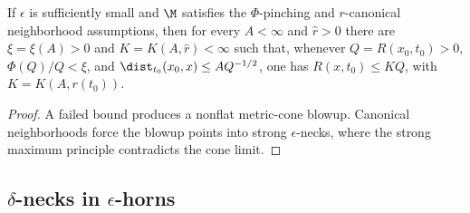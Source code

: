 \begin{lemma}
  \label{lem:kl-curvature-bounds-from-priori-assumptions-canonical-neighborhoods-lemma}
\label{claim2II.4.2}
If $\epsilon$ is sufficiently small and $\M$ satisfies the $\Phi$-pinching
and $r$-canonical neighborhood assumptions, then for every $A<\infty$ and
$\widehat r>0$ there are $\xi=\xi(A)>0$ and $K=K(A,\widehat r)<\infty$ such
that, whenever $Q=R(x_0,t_0)>0$, $\Phi(Q)/Q<\xi$, and
$\dist_{t_0}(x_0,x)\leq A Q^{-1/2}$, one has
$R(x,t_0)\leq KQ$, with $K=K(A,r(t_0))$.
\end{lemma}
\begin{proof}
\sketch A failed bound produces a nonflat metric-cone blowup. Canonical
neighborhoods force the blowup points into strong $\epsilon$-necks, where the
strong maximum principle contradicts the cone limit.
\end{proof}

\subsection{$\delta$-necks in $\epsilon$-horns}

